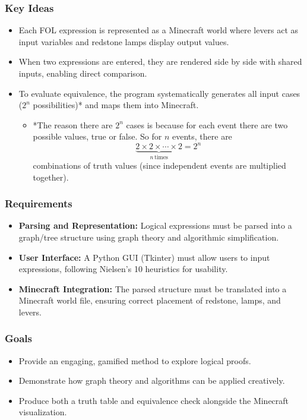 \documentclass[11pt]{diazessay} %
\begin{document}
\subsubsection*{Key Ideas}
\begin{itemize}
    \item Each FOL expression is represented as a Minecraft world where levers act as input variables and redstone lamps display output values.  
    \item When two expressions are entered, they are rendered side by side with shared inputs, enabling direct comparison.  
    \item To evaluate equivalence, the program systematically generates all input cases ($2^n$ possibilities)* and maps them into Minecraft.
    \begin{itemize}
        \item *The reason there are $2^n$ cases is because for each event there are two possible values, true or false. So for $n$ events, there are \[
        \underbrace{2 \times 2 \times \cdots \times 2}_{n\,\mathrm{times}} = 2^n
		\]
	 combinations of truth values (since independent events are multiplied together).
	\end{itemize}
\end{itemize}

\subsubsection*{Requirements}
\begin{itemize}
    \item \textbf{Parsing and Representation:} Logical expressions must be parsed into a graph/tree structure using graph theory and algorithmic simplification.  
    \item \textbf{User Interface:} A Python GUI (Tkinter) must allow users to input expressions, following Nielsen’s 10 heuristics for usability.  
    \item \textbf{Minecraft Integration:} The parsed structure must be translated into a Minecraft world file, ensuring correct placement of redstone, lamps, and levers.  
\end{itemize}

\subsubsection*{Goals}
\begin{itemize}
    \item Provide an engaging, gamified method to explore logical proofs.  
    \item Demonstrate how graph theory and algorithms can be applied creatively.  
    \item Produce both a truth table and equivalence check alongside the Minecraft visualization.  
\end{itemize}
\end{document}
